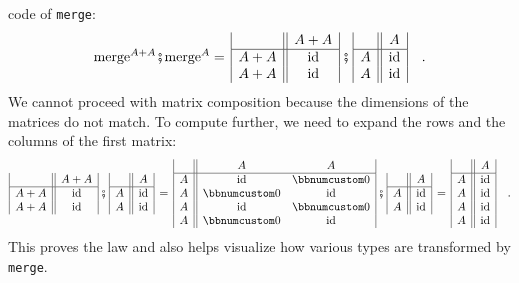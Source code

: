 code of \lstinline!merge!:
\[
\text{merge}^{A+A}\bef\text{merge}^{A}=\,\begin{array}{|c||c|}
 & A+A\\
\hline A+A & \text{id}\\
A+A & \text{id}
\end{array}\,\bef\,\begin{array}{|c||c|}
 & A\\
\hline A & \text{id}\\
A & \text{id}
\end{array}\quad.
\]
We cannot proceed with matrix composition because the dimensions of
the matrices do not match. To compute further, we need to expand the
rows and the columns of the first matrix:
\[
\begin{array}{|c||c|}
 & A+A\\
\hline A+A & \text{id}\\
A+A & \text{id}
\end{array}\,\bef\,\begin{array}{|c||c|}
 & A\\
\hline A & \text{id}\\
A & \text{id}
\end{array}\,=\,\begin{array}{|c||cc|}
 & A & A\\
\hline A & \text{id} & \bbnum 0\\
A & \bbnum 0 & \text{id}\\
A & \text{id} & \bbnum 0\\
A & \bbnum 0 & \text{id}
\end{array}\,\bef\,\begin{array}{|c||c|}
 & A\\
\hline A & \text{id}\\
A & \text{id}
\end{array}\,=\,\begin{array}{|c||c|}
 & A\\
\hline A & \text{id}\\
A & \text{id}\\
A & \text{id}\\
A & \text{id}
\end{array}\quad.
\]
This proves the law and also helps visualize how various types are
transformed by \lstinline!merge!.

